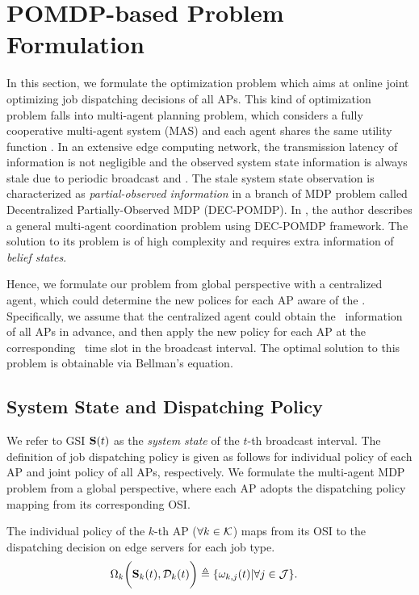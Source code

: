 \section{POMDP-based Problem Formulation}
\label{sec:formulation}
In this section, we formulate the optimization problem which aims at online joint optimizing job dispatching decisions of all APs.
This kind of optimization problem falls into multi-agent planning problem, which considers a fully cooperative multi-agent system (MAS) and each agent shares the same utility function \cite{IJCAI99-BoutilierC}.
In an extensive edge computing network, the transmission latency of information is not negligible and the observed system state information is always stale due to periodic broadcast and \brlatency.
The stale system state observation is characterized as \emph{partial-observed information} in a branch of MDP problem called Decentralized Partially-Observed MDP (DEC-POMDP).
In \cite{IJCAI03-NairR}, the author describes a general multi-agent coordination problem using DEC-POMDP framework. The solution to its problem is of high complexity and requires extra information of \emph{belief states}.

Hence, we formulate our problem from global perspective with a centralized agent, which could determine the new polices for each AP aware of the \brlatency.
Specifically, we assume that the centralized agent could obtain the \brlatency~information of all APs in advance, and then apply the new policy for each AP at the corresponding \brlatency~time slot in the broadcast interval.
The optimal solution to this problem is obtainable via Bellman's equation.

\subsection{System State and Dispatching Policy}
We refer to GSI $\mathbf{S}(t)$ as the \emph{system state} of the $t$-th broadcast interval.
The definition of job dispatching policy is given as follows for individual policy of each AP and joint policy of all APs, respectively.
We formulate the multi-agent MDP problem from a global perspective, where each AP adopts the dispatching policy mapping from its corresponding OSI.
\begin{definition}
    The individual policy of the $k$-th AP ($\forall k \in\mathcal{K}$) maps from its OSI to the dispatching decision on edge servers for each job type.
    \begin{align}
        &\Omega_{k} \bigg( \mathbf{S}_{k}(t), \mathcal{D}_{k}(t) \bigg)
        \triangleq \{\omega_{k,j}(t)|\forall j\in\mathcal{J}\}.
        \label{def:action}
    \end{align}
\end{definition}

